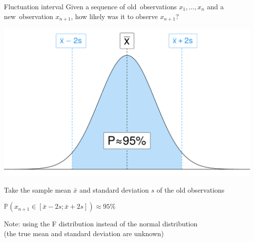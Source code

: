 \documentclass[10pt]{beamer}
\begin{document}
\begin{frame}{Fluctuation interval}
    Given a sequence of \alert{old~observations} $x_1, \dots, x_n$ and a \alert{new~observation} $x_{n+1}$, how likely
    was it to observe $x_{n+1}$?

    \begin{minipage}{0.5\linewidth}
        \begin{center}
            \includegraphics[width=\linewidth]{img/slides/normal.pdf}
        \end{center}
    \end{minipage}\hfill%
    \begin{minipage}{0.48\linewidth}
        Take the sample mean \(\bar x\) and standard deviation \(s\) of the old observations

        \medbreak

        \(\mathbb{P}\left(x_{n+1}\in\left[\bar x - 2s ; \bar x + 2s\right]\right) \approx 95\%\)
    \end{minipage}

    \pause
    Note: using the F distribution instead of the normal distribution\\
    (the \alert{true} mean and standard deviation are unknown)
\end{frame}
\end{document}
